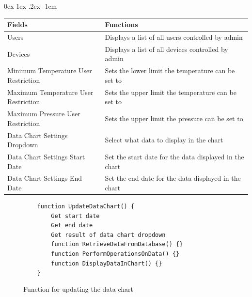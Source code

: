 \documentclass[12pt, a4paper]{article}
\makeatletter
\renewcommand\paragraph{\@startsection{paragraph}{5}{\parindent}%
  {0ex \@plus1ex \@minus.2ex}%
  {-1em}%
  {\normalfont\normalsize\bfseries}}
\makeatother
\begin{document}
                \paragraph{}
                    \begingroup
                        \centering
                        \begin{flushleft}
                            \resizebox{\linewidth}{!} {
                                \begin{tabular}{| m{0.4\linewidth} | m{0.6\linewidth} |}
                                    \hline
                                    \textbf {Fields} & \textbf {Functions} \\ \hline
                                    Users & Displays a list of all users controlled by admin  \\ \hline
                                    Devices & Displays a list of all devices controlled by admin  \\ \hline
                                    Minimum Temperature User Restriction & Sets the lower limit the temperature can be set to  \\ \hline
                                    Maximum Temperature User Restriction & Sets the upper limit the temperature can be set to  \\ \hline
                                    Maximum Pressure User Restriction & Sets the upper limit the pressure can be set to  \\ \hline
                                    Data Chart Settings Dropdown & Select what data to display in the chart \\ \hline
                                    Data Chart Settings Start Date & Set the start date for the data displayed in the chart  \\ \hline
                                    Data Chart Settings End Date & Set the end date for the data displayed in the chart  \\
                                    \hline
                                \end{tabular}
                            }
                            \label{tbl:userrestrictionstable}
                        \end{flushleft}
                    \endgroup
                    \footnotesize
                    \begin{figure}[H]
                        \begin{lstlisting}
    function UpdateDataChart() {
        Get start date
        Get end date
        Get result of data chart dropdown
        function RetrieveDataFromDatabase() {}
        function PerformOperationsOnData() {}
        function DisplayDataInChart() {}
    }                                              
                        \end{lstlisting}
                        \caption{Function for updating the data chart}
                    \end{figure}
\end{document}
